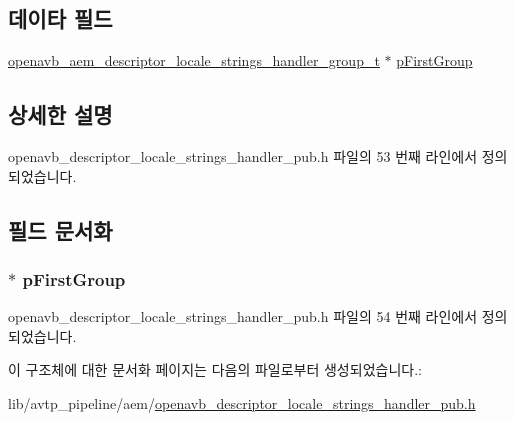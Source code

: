 \subsection*{데이타 필드}
\begin{DoxyCompactItemize}
\item 
\hyperlink{openavb__descriptor__locale__strings__handler__pub_8h_aeeaf82e4e318f172809dbcd3bf3b1e9c}{openavb\+\_\+aem\+\_\+descriptor\+\_\+locale\+\_\+strings\+\_\+handler\+\_\+group\+\_\+t} $\ast$ \hyperlink{structopenavb__aem__descriptor__locale__strings__handler__t_a2eab1b908b590a7e7ac0f6fa4effd432}{p\+First\+Group}
\end{DoxyCompactItemize}


\subsection{상세한 설명}


openavb\+\_\+descriptor\+\_\+locale\+\_\+strings\+\_\+handler\+\_\+pub.\+h 파일의 53 번째 라인에서 정의되었습니다.



\subsection{필드 문서화}
\subsubsection[{\texorpdfstring{p\+First\+Group}{pFirstGroup}}]{$\ast$ p\+First\+Group}\hypertarget{structopenavb__aem__descriptor__locale__strings__handler__t_a2eab1b908b590a7e7ac0f6fa4effd432}{}\label{structopenavb__aem__descriptor__locale__strings__handler__t_a2eab1b908b590a7e7ac0f6fa4effd432}


openavb\+\_\+descriptor\+\_\+locale\+\_\+strings\+\_\+handler\+\_\+pub.\+h 파일의 54 번째 라인에서 정의되었습니다.



이 구조체에 대한 문서화 페이지는 다음의 파일로부터 생성되었습니다.\+:\begin{DoxyCompactItemize}
\item 
lib/avtp\+\_\+pipeline/aem/\hyperlink{openavb__descriptor__locale__strings__handler__pub_8h}{openavb\+\_\+descriptor\+\_\+locale\+\_\+strings\+\_\+handler\+\_\+pub.\+h}\end{DoxyCompactItemize}
